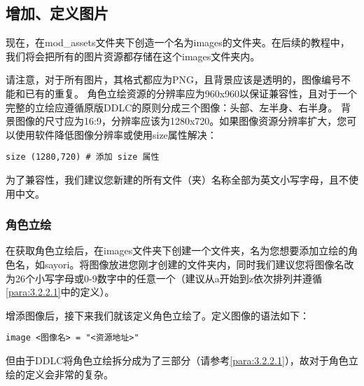 \subsection{增加、定义图片}

现在，在mod\_assets文件夹下创造一个名为images的文件夹。在后续的教程中，我们将会把所有的图片资源都存储在这个images文件夹内。

\begin{Warning}
请注意，对于所有图片，其格式都应为PNG，且背景应该是透明的，图像编号不能和已有的重复。
角色立绘资源的分辨率应为960x960以保证兼容性，且对于一个完整的立绘应遵循原版DDLC的原则分成三个图像：头部、左半身、右半身。
背景图像的尺寸应为16:9，分辨率应该为1280x720。如果图像资源分辨率扩大，您可以使用软件降低图像分辨率或使用size属性解决：
\begin{lstlisting}
size (1280,720) # 添加 size 属性
\end{lstlisting}

为了兼容性，我们建议您新建的所有文件（夹）名称全部为英文小写字母，且不使用中文。
\end{Warning}

\subsubsection{角色立绘}

在获取角色立绘后，在images文件夹下创建一个文件夹，名为您想要添加立绘的角色名，如sayori。将图像放进您刚才创建的文件夹内，同时我们建议您将图像名改为26个小写字母或0-9数字中的任意一个（建议从a开始到z依次排列并遵循\ref{para:3.2.2.1}中的定义）。

增添图像后，接下来我们就该定义角色立绘了。定义图像的语法如下：

\begin{lstlisting}
image <图像名> = "<资源地址>"
\end{lstlisting}

但由于DDLC将角色立绘拆分成为了三部分（请参考\ref{para:3.2.2.1}），故对于角色立绘的定义会非常的复杂。

